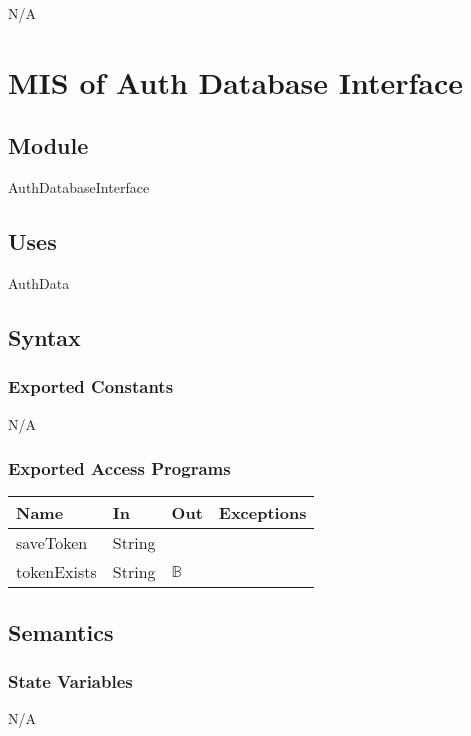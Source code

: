 \documentclass[12pt, titlepage]{article}
\begin{document}
	N/A
	
	\newpage
	
	\section{MIS of Auth Database Interface} \label{Module} 
	
	\subsection{Module}
	AuthDatabaseInterface
	
	\subsection{Uses}
	AuthData
	
	\subsection{Syntax}
	
	\subsubsection{Exported Constants}
	N/A
	
	\subsubsection{Exported Access Programs}
	
	\begin{center}
		\begin{tabular}{l  l  l  l}
			\hline
			\textbf{Name} & \textbf{In} & \textbf{Out} & \textbf{Exceptions} \\
			\hline
			saveToken & String & ~ & ~ \\
			\hline
			tokenExists & String & $\mathbb{B}$ & ~ \\
			\hline
		\end{tabular}
	\end{center}
	
	\subsection{Semantics}
	
	\subsubsection{State Variables}
	N/A
	
\end{document}
